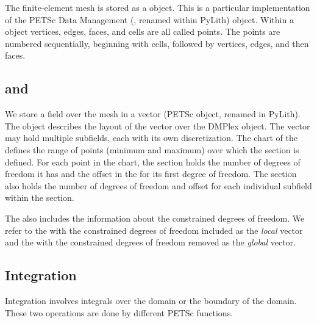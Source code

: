The finite-element mesh is stored as a  object. This is
a particular implementation of the PETSc Data Management (,
renamed  within PyLith) object. Within a
 object vertices, edges, faces, and cells are all
called points. The points are numbered sequentially, beginning with
cells, followed by vertices, edges, and then faces.


\subsection{ and }

We store a field over the mesh in a vector (PETSc  object,
renamed  in PyLith). The  object
describes the layout of the vector over the DMPlex object. The vector
may hold multiple subfields, each with its own discretization. The
chart of the  defines the range of points
(minimum and maximum) over which the section is defined. For each
point in the chart, the section holds the number of degrees of freedom
it has and the offset in the  for its first degree of
freedom. The section also holds the number of degrees of freedom and
offset for each individual subfield within the section.

The  also includes the information about the
constrained degrees of freedom. We refer to the  with
the constrained degrees of freedom included as the {\em local} vector
and the  with the constrained degrees of freedom
removed as the {\em global} vector.


\subsection{Integration}

Integration involves integrals over the domain or the boundary of the
domain. These two operations are done by different PETSc functions.

